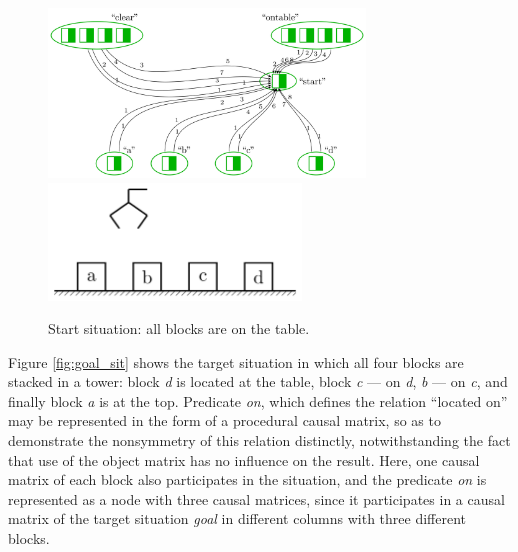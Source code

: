 \documentclass[review]{elsarticle}
\begin{document}
\begin{figure}
	\centering
	\includegraphics[width=0.75\textwidth]{plan_nets-2}
	\includegraphics[width=0.6\textwidth]{block_world-1}
	\caption{Start situation: all blocks are on the table.}	
	\label{fig:start_sit}	
\end{figure}

Figure \ref{fig:goal_sit} shows the target situation in which all four blocks are stacked in a tower: block \textit{d} is located at the table, block \textit{c} --- on \textit{d}, \textit{b} --- on \textit{c}, and finally block \textit{a} is at the top. Predicate \textit{on}, which defines the relation ``located on'' may be represented in the form of a procedural causal matrix, so as to demonstrate the nonsymmetry of this relation distinctly, notwithstanding the fact that use of the object matrix has no influence on the result. Here, one causal matrix of each block also participates in the situation, and the predicate \textit{on} is represented as a node with three causal matrices, since it participates in a causal matrix of the target situation \textit{goal} in different columns with three different blocks.
\end{document}
